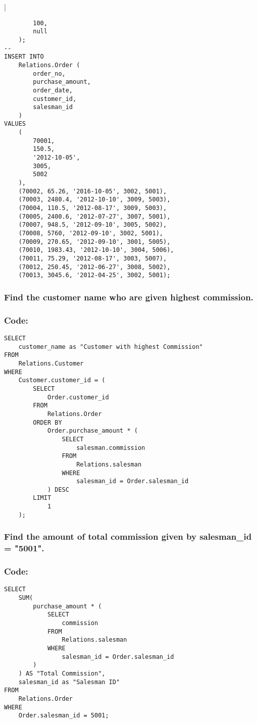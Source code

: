 \documentclass[12pt]{article}
\begin{document}
\begin{multicols}{2}{|}
\begin{verbatim}
        100,
        null
    );
--
INSERT INTO
    Relations.Order (
        order_no,
        purchase_amount,
        order_date,
        customer_id,
        salesman_id
    )
VALUES
    (
        70001,
        150.5,
        '2012-10-05',
        3005,
        5002
    ),
    (70002, 65.26, '2016-10-05', 3002, 5001),
    (70003, 2480.4, '2012-10-10', 3009, 5003),
    (70004, 110.5, '2012-08-17', 3009, 5003),
    (70005, 2400.6, '2012-07-27', 3007, 5001),
    (70007, 948.5, '2012-09-10', 3005, 5002),
    (70008, 5760, '2012-09-10', 3002, 5001),
    (70009, 270.65, '2012-09-10', 3001, 5005),
    (70010, 1983.43, '2012-10-10', 3004, 5006),
    (70011, 75.29, '2012-08-17', 3003, 5007),
    (70012, 250.45, '2012-06-27', 3008, 5002),
    (70013, 3045.6, '2012-04-25', 3002, 5001);
    \end{verbatim}
\end{multicols}

\vspace{10mm}


\subsubsection{Find the customer name who are given highest commission.}
\subsubsection*{Code:}
\begin{verbatim}
SELECT
    customer_name as "Customer with highest Commission"
FROM
    Relations.Customer
WHERE
    Customer.customer_id = (
        SELECT
            Order.customer_id
        FROM
            Relations.Order
        ORDER BY
            Order.purchase_amount * (
                SELECT
                    salesman.commission
                FROM
                    Relations.salesman
                WHERE
                    salesman_id = Order.salesman_id
            ) DESC
        LIMIT
            1
    );
\end{verbatim}
\vspace{10mm}

\subsubsection{Find the amount of total commission given by salesman\_id = "5001".}
\subsubsection*{Code: }
\begin{verbatim}
SELECT
    SUM(
        purchase_amount * (
            SELECT
                commission
            FROM
                Relations.salesman
            WHERE
                salesman_id = Order.salesman_id
        )
    ) AS "Total Commission",
    salesman_id as "Salesman ID"
FROM
    Relations.Order
WHERE
    Order.salesman_id = 5001;
\end{verbatim}
\end{document}
